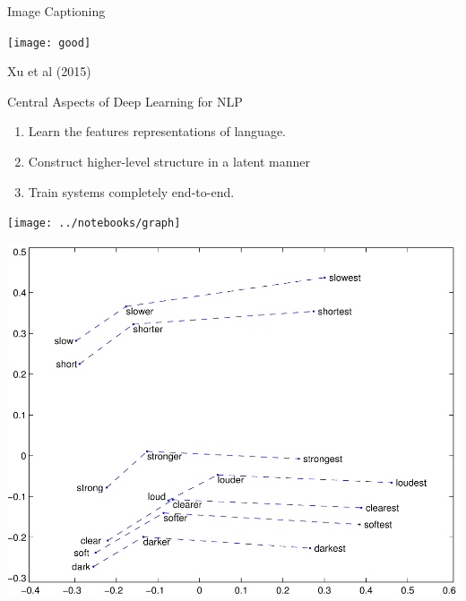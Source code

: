 \documentclass{beamer}
\begin{document}
\begin{frame}{Image Captioning}
  \begin{center}
    \texttt{[image: good]}
    \caption{Xu et al (2015)}
  \end{center}
\end{frame}

\begin{frame}{Central Aspects of Deep Learning for NLP}
  \begin{enumerate}
  \item Learn the features representations of language.
    \pause
    \air 

  \item Construct higher-level structure in a latent manner
    \pause
    
    \air

  \item Train systems completely end-to-end.
  \end{enumerate}
\end{frame}

\begin{frame}
  \vspace{-5cm}
  
  \hspace*{-2cm}
  \texttt{[image: ../notebooks/graph]}
\end{frame}

\begin{frame}
  \begin{center}
    \includegraphics[width=1\textwidth]{compare}
  \end{center}
\end{frame}
\end{document}
